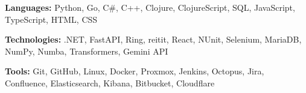 \begin{onecolentry}
    \textbf{Languages:} Python, Go, C\#, C++, Clojure, ClojureScript, SQL, JavaScript, TypeScript, HTML, CSS
\end{onecolentry}

\vspace{0.09 cm}

\begin{onecolentry}
    \textbf{Technologies:} .NET, FastAPI, Ring, reitit, React, NUnit, Selenium, MariaDB, NumPy, Numba, Transformers, Gemini API
\end{onecolentry}

\vspace{0.09 cm}

\begin{onecolentry}
    \textbf{Tools:} Git, GitHub, Linux, Docker, Proxmox, Jenkins, Octopus, Jira, Confluence, Elasticsearch, Kibana, Bitbucket, Cloudflare
\end{onecolentry}

\vspace{0.09 cm}
